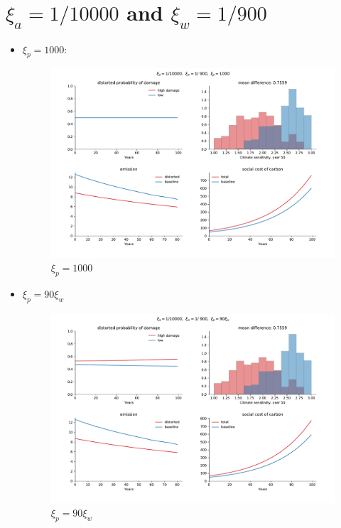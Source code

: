 \documentclass{article}
\begin{document}
\newpage
\section{\(\xi_a= 1/10000\) and \(\xi_w=1/900\)}\label{sec:sec4}
\begin{itemize}
    \item \(\xi_p= 1000\):
        \begin{figure}[H]
            \centering
            \includegraphics[width=\linewidth]{notebook/10_900_1000.pdf}
            \caption{\(\xi_p=1000\)}
            \label{fig:notebook/10_900_90}
        \end{figure}
        \newpage
    \item \(\xi_p= 90\xi_w\)
        \begin{figure}[H]
            \centering
            \includegraphics[width=\linewidth]{notebook/10_900_90.pdf}
            \caption{\(\xi_p=90\xi_w\)}

\end{figure}
\end{itemize}
\end{document}
